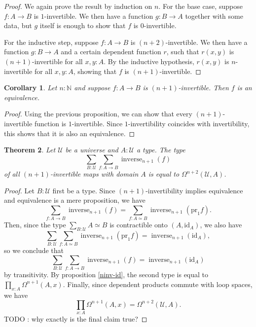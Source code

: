 \documentclass{article}
\theoremstyle{plain}
\newtheorem{theorem}{Theorem}
\newtheorem{corollary}[theorem]{Corollary}
\theoremstyle{definition}
\theoremstyle{remark}
\newcommand{\id}{\mathrm{id}}
\newcommand{\pr}{\mathrm{pr}}
\newcommand{\U}{\mathcal{U}}
\newcommand{\N}{\mathbb{N}}
\newcommand{\lspace}[1]{\Omega^{#1}}
\DeclareMathOperator{\inverse}{inverse}
\newcommand{\ninverse}[1]{\inverse_{#1}}
\begin{document}
\begin{proof}
  We again prove the result by induction on \(n\). For the base case, suppose \(f : A \to B\)
  is \(1\)-invertible. We then have a function \(g : B \to A\) together with some data,
  but \(g\) itself is enough to show that \(f\) is \(0\)-invertible.

  For the inductive step,
  suppose \(f : A \to B\) is \((n + 2)\)-invertible. We then have a function
  \(g : B \to A\) and a certain dependent function \(r\), such that \(r(x, y)\) is
  \((n + 1)\)-invertible for all \(x, y : A\). By the inductive hypothesis, \(r(x, y)\) is
  \(n\)-invertible for all \(x, y : A\), showing that \(f\) is \((n + 1)\)-invertible.
\end{proof}

\begin{corollary}
  Let \(n : \N\) and suppose \(f : A \to B\) is \((n + 1)\)-invertible. Then \(f\) is an
  equivalence.
\end{corollary}

\begin{proof}
  Using the previous proposition, we can show that every \((n + 1)\)-invertible function is
  \(1\)-invertible. Since \(1\)-invertibility coincides with invertibility, this shows that
  it is also an equivalence.
\end{proof}

\begin{theorem}
  \label{ninv-maps-with-domain}
  Let \(\U\) be a universe and \(A : \U\) a type. The type
  \[\sum_{B : \U}\sum_{f : A \to B}\inverse_{n + 1}(f)\] of all \((n + 1)\)-invertible maps
  with domain \(A\) is equal to
  \(\lspace{n + 2}(\U, A)\).
\end{theorem}

\begin{proof}
  Let \(B : \U\) first be a type. Since \((n + 1)\)-invertibility implies equivalence and
  equivalence is a mere proposition, we have
  \[\sum_{f : A \to B}\ninverse{n + 1}(f) = \sum_{f : A \simeq B}\ninverse{n + 1}(\pr_{1}f).\]
  Then, since the type \(\sum_{B : \U}{A \simeq B}\) is contractible onto \((A, \id_{A})\), we also have
  \[\sum_{B : \U}\sum_{f : A \simeq B}\ninverse{n + 1}(\pr_{1}f) =
    \ninverse{n + 1}{(\id_{A})},\]
  so we conclude that
  \[\sum_{B : \U}\sum_{f : A \to B}\ninverse{n + 1}(f) = \ninverse{n + 1}(\id_{A})\]
  by transitivity.
  By proposition \ref{ninv-id}, the second type is equal to
  \(\prod_{x : A}\lspace{n + 1}(A, x)\). Finally, since dependent products commute with loop
  spaces, we have
  \[\prod_{x : A}\lspace{n + 1}(A, x) = \lspace{n + 2}(\U, A).\]
  TODO : why exactly is the final claim true?
\end{proof}
\end{document}

